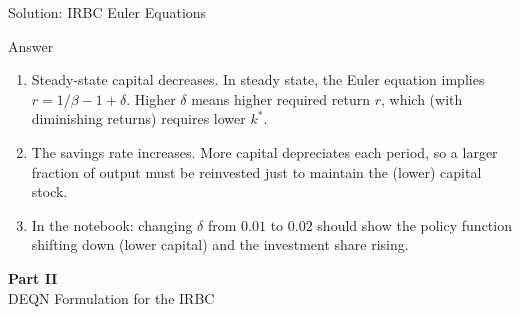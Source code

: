 \documentclass[aspectratio=169,11pt]{beamer}
\newcommand{\emphc}[1]{\textcolor{harvardcrimson}{#1}}
\begin{document}
\begin{frame}{Solution: IRBC Euler Equations}
\begin{block}{Answer}
\begin{enumerate}
    \item Steady-state capital \emphc{decreases}. In steady state, the Euler equation implies $r = 1/\beta - 1 + \delta$. Higher $\delta$ means higher required return $r$, which (with diminishing returns) requires lower $k^*$.
    \item The savings rate \emphc{increases}. More capital depreciates each period, so a larger fraction of output must be reinvested just to maintain the (lower) capital stock.
    \item In the notebook: changing $\delta$ from $0.01$ to $0.02$ should show the policy function shifting down (lower capital) and the investment share rising.
\end{enumerate}
\end{block}
\end{frame}


\begin{frame}{}
\vfill
\begin{center}
{\Huge \textcolor{uzhblue}{\textbf{Part II}}}\\[12pt]
{\LARGE DEQN Formulation for the IRBC}
\end{center}
\vfill
\end{frame}
\end{document}

